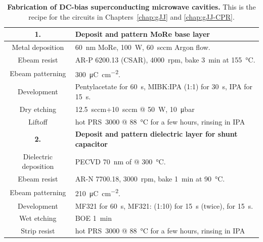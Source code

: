 \begin{table}
	\caption{
		\textbf{Fabrication of DC-bias superconducting microwave cavities.}
		This is the recipe for the circuits in Chapters~\ref{chap:gJJ} and \ref{chap:gJJ-CPR}.
	}
	\label{tab:fabRF}
\begin{tabularx}{\textwidth}{@{}cY@{}}
	\hline \hline
	\textbf{1.} & \textbf{Deposit and pattern MoRe base layer} \\
	\hline 
	Metal deposition & \SI{60}{\nano\meter} MoRe, \SI{100}{\watt}, \SI{60}{sccm} Argon flow. \\
	Ebeam resist & AR-P 6200.13 (CSAR), \SI{4000}{rpm}, bake \SI{3}{\minute} at \SI{155}{\celsius}. \\
	Ebeam patterning & \SI{300}{\micro\coulomb\per\centi\meter\squared}. \\
	Development & Pentylacetate for \SI{60}{\second}, MIBK:IPA (1:1) for \SI{30}{\second}, IPA for \SI{15}{\second}. \\
	Dry etching &  \SI{12.5}{sccm}+\SI{10}{sccm} @ \SI{50}{\watt}, \SI{10}{\micro\bar} \\
	Liftoff & hot PRS~3000 @ \SI{88}{\celsius} for a few hours, rinsing in IPA \\
	\hline
	
	\textbf{2.} & \textbf{Deposit and pattern dielectric layer for shunt capacitor} \\
	\hline 
	Dielectric deposition & PECVD \SI{70}{\nano\meter} of  @ \SI{300}{\celsius}. \\
	Ebeam resist & AR-N 7700.18, \SI{3000}{rpm}, bake \SI{1}{\minute} at \SI{90}{\celsius}. \\
	Ebeam patterning & \SI{210}{\micro\coulomb\per\centi\meter\squared}. \\
	Development & MF321 for \SI{60}{\second}, MF321: (1:10) for \SI{15}{\second} (twice),  for \SI{15}{\second}. \\
	Wet etching & BOE \SI{1}{\minute} \\
	Strip resist & hot PRS~3000 @ \SI{88}{\celsius} for a few hours, rinsing in IPA \\
	\hline
	

\end{tabularx}
\end{table}
